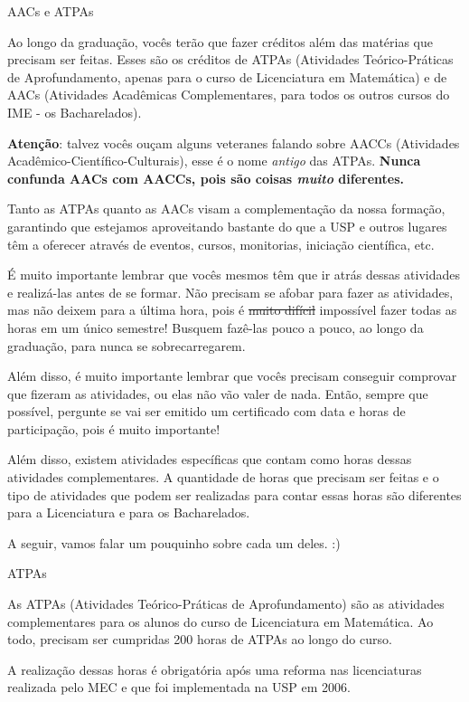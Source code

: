 \begin{secao}{AACs e ATPAs}

Ao longo da graduação, vocês terão que fazer créditos além das matérias
que precisam ser feitas. Esses são os créditos de ATPAs (Atividades
Teórico-Práticas de Aprofundamento, apenas para o curso de Licenciatura
em Matemática) e de AACs (Atividades Acadêmicas Complementares, para todos
os outros cursos do IME - os Bacharelados).

\textbf{Atenção}: talvez vocês ouçam
alguns veteranes falando sobre AACCs (Atividades Acadêmico-Científico-Culturais),
esse é o nome \textit{antigo} das ATPAs.
\textbf{Nunca confunda AACs com AACCs, pois são coisas \textit{muito} diferentes.}

Tanto as ATPAs quanto as AACs visam a complementação da nossa formação,
garantindo que estejamos aproveitando bastante do que a USP e outros
lugares têm a oferecer através de eventos, cursos, monitorias, iniciação
científica, etc.

É muito importante lembrar que vocês mesmos têm que ir atrás dessas
atividades e realizá-las antes de se formar. Não precisam se afobar para
fazer as atividades, mas não deixem para a última hora, pois é
\sout{muito difícil} impossível fazer todas as horas em um único semestre!
Busquem fazê-las pouco a pouco, ao longo da graduação, para nunca se
sobrecarregarem.

Além disso, é muito importante lembrar que vocês precisam conseguir
comprovar que fizeram as atividades, ou elas não vão valer de nada.
Então, sempre que possível, pergunte se vai ser emitido um certificado
com data e horas de participação, pois é muito importante!

Além disso, existem atividades específicas que contam como horas
dessas atividades complementares. A quantidade de horas que precisam
ser feitas e o tipo de atividades que podem ser realizadas para contar
essas horas são diferentes para a Licenciatura e para os Bacharelados.

A seguir, vamos falar um pouquinho sobre cada um deles. :)

\begin{subsecao}{ATPAs}

As ATPAs (Atividades Teórico-Práticas de Aprofundamento) são as
atividades complementares para os alunos do curso de Licenciatura em
Matemática. Ao todo, precisam ser cumpridas 200 horas de ATPAs ao longo do curso.

A realização dessas horas é obrigatória após uma reforma nas licenciaturas
realizada pelo MEC e que foi implementada na USP em 2006.


\end{subsecao}
\end{secao}
